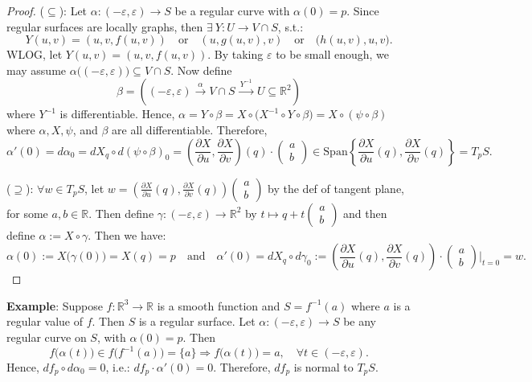 \begin{proof}
($\subseteq$): Let $\alpha: (-\varepsilon, \varepsilon)\to S$ be a regular curve with $\alpha(0) = p$. Since regular surfaces are locally graphs, then $\exists\ Y: U\to V\cap S$, s.t.:
\[
Y(u, v) = (u, v, f(u, v)) \quad\text{or}\quad (u, g(u, v), v) \quad\text{or}\quad \big(h(u, v), u, v\big).
\]
WLOG, let $Y(u, v) = (u, v, f(u, v))$. By taking $\varepsilon$ to be small enough, we may assume $\alpha\big((-\varepsilon, \varepsilon)\big)\subseteq V\cap S$. Now define
\[
\beta = \left((- \varepsilon, \varepsilon)\xrightarrow{\ \alpha\ }V\cap S\xrightarrow{\ Y^{-1}\ }U\subseteq\mathbb{R}^2\right)
\]
where $Y^{-1}$ is differentiable. Hence, $\alpha = Y\circ\beta = X\circ\big(X^{-1}\circ Y\circ\beta\big) = X\circ(\psi\circ\beta)$ where $\alpha, X, \psi$, and $\beta$ are all differentiable. Therefore,
\[
\alpha'(0) = d\alpha_0 = dX_q\circ d(\psi\circ\beta)_0 = \left(\frac{\partial X}{\partial u}, \frac{\partial X}{\partial v}\right)(q)\cdot\begin{pmatrix}a\\ b\end{pmatrix}\in\mathrm{Span}\left\{\frac{\partial X}{\partial u}(q), \frac{\partial X}{\partial v}(q)\right\} = T_pS.
\]

\noindent ($\supseteq$): $\forall w\in T_pS$, let $w = \left(\frac{\partial X}{\partial u}(q), \frac{\partial X}{\partial v}(q)\right)\begin{pmatrix}a\\ b\end{pmatrix}$ by the def of tangent plane, for some $a, b\in\mathbb{R}$. Then define $\gamma: (-\varepsilon, \varepsilon)\to\mathbb{R}^2$ by $t\mapsto q + t\begin{pmatrix}a\\ b\end{pmatrix}$ and then define $\alpha := X\circ\gamma$. Then we have:
\[
\alpha(0) := X\big(\gamma(0)\big) = X(q) = p \quad\text{and}\quad \alpha'(0) = dX_q\circ d\gamma_0 := \left(\frac{\partial X}{\partial u}(q), \frac{\partial X}{\partial v}(q)\right)\cdot\begin{pmatrix}a\\ b\end{pmatrix}\Bigg|_{t=0} = w.
\]
\end{proof}

\noindent\textbf{Example}: Suppose $f: \mathbb{R}^3\to\mathbb{R}$ is a smooth function and $S = f^{-1}(a)$ where $a$ is a regular value of $f$. Then $S$ is a regular surface. Let $\alpha: (-\varepsilon, \varepsilon)\to S$ be any regular curve on $S$, with $\alpha(0) = p$. Then
\[
f\big(\alpha(t)\big)\in f\big(f^{-1}(a)\big) = \{a\} \Rightarrow f\big(\alpha(t)\big) = a, \quad \forall t\in(-\varepsilon, \varepsilon).
\]
Hence, $df_p\circ d\alpha_0 = 0$, i.e.: $df_p\cdot\alpha'(0) = 0$. Therefore, $df_p$ is normal to $T_pS$.

